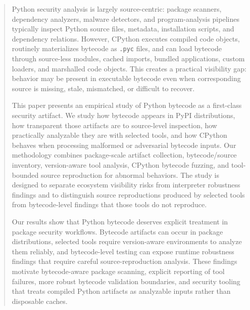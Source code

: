 
\begin{abstract}
Python security analysis is largely source-centric: package scanners, dependency analyzers, malware detectors, and program-analysis pipelines typically inspect Python source files, metadata, installation scripts, and dependency relations.  However, CPython executes compiled code objects, routinely materializes bytecode as \texttt{.pyc} files, and can load bytecode through source-less modules, cached imports, bundled applications, custom loaders, and marshalled code objects.  This creates a practical visibility gap: behavior may be present in executable bytecode even when corresponding source is missing, stale, mismatched, or difficult to recover.

This paper presents an empirical study of Python bytecode as a first-class security artifact.  We study how bytecode appears in PyPI distributions, how transparent those artifacts are to source-level inspection, how practically analyzable they are with selected tools, and how CPython behaves when processing malformed or adversarial bytecode inputs.  Our methodology combines package-scale artifact collection, bytecode/source inventory, version-aware tool analysis, CPython bytecode fuzzing, and tool-bounded source reproduction for abnormal behaviors.  The study is designed to separate ecosystem visibility risks from interpreter robustness findings and to distinguish source reproductions produced by selected tools from bytecode-level findings that those tools do not reproduce.

Our results show that Python bytecode deserves explicit treatment in package security workflows.  Bytecode artifacts can occur in package distributions, selected tools require version-aware environments to analyze them reliably, and bytecode-level testing can expose runtime robustness findings that require careful source-reproduction analysis.  These findings motivate bytecode-aware package scanning, explicit reporting of tool failures, more robust bytecode validation boundaries, and security tooling that treats compiled Python artifacts as analyzable inputs rather than disposable caches.

\end{abstract}

